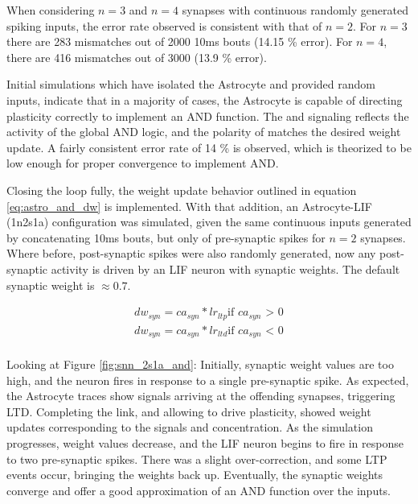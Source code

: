 
When considering $n=3$ and $n=4$ synapses with continuous randomly generated
spiking inputs, the error rate observed is consistent with that of $n=2$. For
$n=3$ there are 283 mismatches out of 2000 10ms bouts (14.15 \% error). For
$n=4$, there are 416 mismatches out of 3000 (13.9 \% error).

Initial simulations which have isolated the Astrocyte and provided random
inputs, indicate that in a majority of cases, the Astrocyte is capable of
directing plasticity correctly to implement an AND function. The
\dser and \serca signaling reflects the activity of the global AND logic, and
the polarity of \dser matches the desired weight update. A fairly consistent
error rate of 14 \% is observed, which is theorized to be low enough for proper
convergence to implement AND.

Closing the loop fully, the weight update behavior outlined in equation
\ref{eq:astro_and_dw} is implemented. With that addition, an Astrocyte-LIF (1n2s1a)
configuration was simulated, given the same continuous inputs generated by
concatenating 10ms bouts, but only of pre-synaptic spikes for $n=2$
synapses. Where before, post-synaptic spikes were also randomly generated, now
any post-synaptic activity is driven by an LIF neuron with synaptic weights.
The default synaptic weight is $\approx 0.7$.

\begin{align}
  dw_{syn} = ca_{syn} * lr_{ltp} \text{if $ca_{syn}$ > 0} \\
  dw_{syn} = ca_{syn} * lr_{ltd} \text{if $ca_{syn}$ < 0} \\
\end{align}



Looking at Figure \ref{fig:snn_2s1a_and}: Initially, synaptic weight values are
too high, and the neuron fires in response to a single pre-synaptic spike. As
expected, the Astrocyte traces show \dser signals arriving at the offending
synapses, triggering LTD. Completing the link, and allowing \ca to drive
plasticity, showed weight updates corresponding to the \dser signals and \ca
concentration. As the simulation progresses, weight values decrease, and the LIF
neuron begins to fire in response to two pre-synaptic spikes. There was a slight
over-correction, and some LTP events occur, bringing the weights back
up. Eventually, the synaptic weights converge and offer a good approximation of
an AND function over the inputs.

